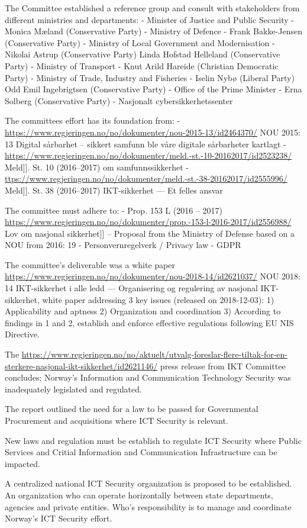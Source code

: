\begin{followup}
    The Committee established a reference group and consult with
    stakeholders from different ministries and departments:
    - Minister of Justice and Public Security - Monica Mæland (Conservative Party)
    - Ministry of Defence - Frank Bakke-Jensen (Conservative Party)
    - Ministry of Local Government and Modernisation - Nikolai Astrup (Conservative Party) Linda Hofstad Helleland (Conservative Party)
    - Ministry of Transport - Knut Arild Hareide (Christian Democratic Party)
    - Ministry of Trade, Industry and Fisheries - Iselin Nybø (Liberal Party) Odd Emil Ingebrigtsen (Conservative Party)
    - Office of the Prime Minister - Erna Solberg (Conservative Party)
    - Nasjonalt cybersikkerhetssenter

    The committees effort has its foundation from:
    - \url{https://www.regjeringen.no/no/dokumenter/nou-2015-13/id2464370/} NOU 2015: 13 Digital sårbarhet – sikkert samfunn ble våre digitale sårbarheter kartlagt
    - \url{https://www.regjeringen.no/no/dokumenter/meld.-st.-10-20162017/id2523238/} Meld]]. St. 10 (2016–2017) om samfunnssikkerhet
    - \url{ttps://www.regjeringen.no/no/dokumenter/meld.-st.-38-20162017/id2555996/} Meld]]. St. 38 (2016–2017) IKT-sikkerhet — Et felles ansvar

    The committee must adhere to:
    - Prop. 153 L (2016 – 2017) \url{https://www.regjeringen.no/no/dokumenter/prop.-153-l-2016-2017/id2556988/} Lov om nasjonal sikkerhet]]
    -- Proposal from the Ministry of Defense based on a NOU from 2016: 19
    - Personvernregelverk / Privacy law
    - GDPR


    The committee's deliverable was a white paper \url{https://www.regjeringen.no/no/dokumenter/nou-2018-14/id2621037/} NOU 2018: 14 IKT-sikkerhet i alle ledd — Organisering og regulering av nasjonal IKT-sikkerhet, white paper
    addressing 3 key issues (released on 2018-12-03):
    1) Applicability and aptness
    2) Organization and coordination
    3) According to findings in 1 and 2, establish and enforce
    effective regulations following EU NIS Directive.

    The \url{https://www.regjeringen.no/no/aktuelt/utvalg-foreslar-flere-tiltak-for-en-sterkere-nasjonal-ikt-sikkerhet/id2621146/} press release from IKT Committee concludes:
    Norway's Information and Communication Technology Security
    was inadequately legislated and regulated.

    The report outlined the need for a law to be passed for
    Governmental Procurement and acquisitions where
    ICT Security is relevant.
    
    New laws and regulation must be establish to regulate
    ICT Security where Public Services and Critial Information
    and Communication Infrastructure can be impacted.

    A centralized national ICT Security organization is
    proposed to be established. An organization who can
    operate horizontally between state departments, agencies
    and private entities. Who's responsibility is to manage
    and coordinate Norway's ICT Security effort.
\end{followup}


